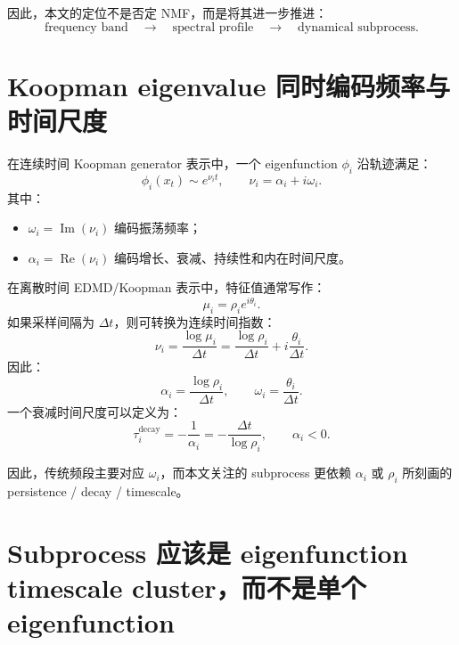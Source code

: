 \documentclass[11pt,a4paper]{ctexart}
\begin{document}
因此，本文的定位不是否定 NMF，而是将其进一步推进：
\begin{equation}
\text{frequency band}
\quad\longrightarrow\quad
\text{spectral profile}
\quad\longrightarrow\quad
\text{dynamical subprocess}.
\end{equation}

\section{Koopman eigenvalue 同时编码频率与时间尺度}

在连续时间 Koopman generator 表示中，一个 eigenfunction $\phi_i$ 沿轨迹满足：
\begin{equation}
\phi_i(x_t) \sim e^{\nu_i t},
\qquad
\nu_i = \alpha_i + i\omega_i.
\end{equation}
其中：
\begin{itemize}[leftmargin=2em]
    \item $\omega_i = \operatorname{Im}(\nu_i)$ 编码振荡频率；
    \item $\alpha_i = \operatorname{Re}(\nu_i)$ 编码增长、衰减、持续性和内在时间尺度。
\end{itemize}

在离散时间 EDMD/Koopman 表示中，特征值通常写作：
\begin{equation}
\mu_i = \rho_i e^{i\theta_i}.
\end{equation}
如果采样间隔为 $\Delta t$，则可转换为连续时间指数：
\begin{equation}
\nu_i = \frac{\log \mu_i}{\Delta t}
= \frac{\log \rho_i}{\Delta t} + i\frac{\theta_i}{\Delta t}.
\end{equation}
因此：
\begin{equation}
\alpha_i = \frac{\log \rho_i}{\Delta t},
\qquad
\omega_i = \frac{\theta_i}{\Delta t}.
\end{equation}
一个衰减时间尺度可以定义为：
\begin{equation}
\tau_i^{\mathrm{decay}} = -\frac{1}{\alpha_i}
= -\frac{\Delta t}{\log \rho_i},
\qquad \alpha_i < 0.
\end{equation}

因此，传统频段主要对应 $\omega_i$，而本文关注的 subprocess 更依赖 $\alpha_i$ 或 $\rho_i$ 所刻画的 persistence / decay / timescale。

\section{Subprocess 应该是 eigenfunction timescale cluster，而不是单个 eigenfunction}
\end{document}
